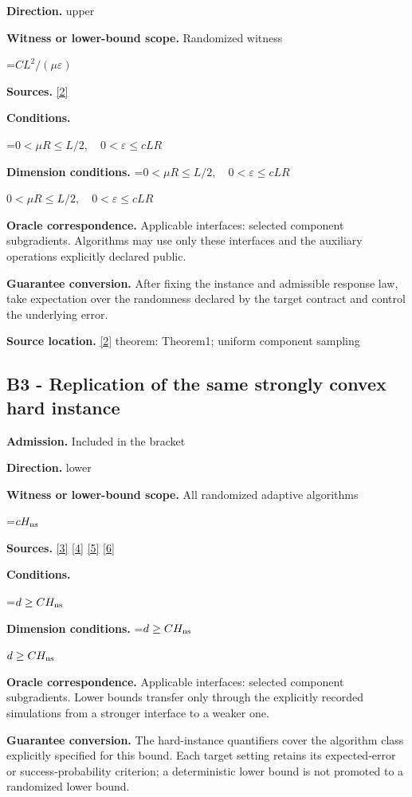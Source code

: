 \documentclass[10pt,a4paper]{article}
\newcommand{\AtlasMath}[1]{\par\begingroup\centering\setbox0=\hbox{$\displaystyle #1$}\ifdim\wd0>1.4\linewidth\typeout{ATLAS WIDE FORMULA: \the\wd0}\fi\ifdim\wd0>\linewidth\resizebox{\linewidth}{!}{\box0}\else\box0\fi\par\endgroup}
\newcommand{\AtlasInlineMath}[1]{\begingroup\setbox0=\hbox{$#1$}\ifdim\wd0>.4\linewidth\endgroup\AtlasMath{#1}\else\endgroup$#1$\fi}
\begin{document}
\textbf{Direction.} upper

\textbf{Witness or lower-bound scope.} Randomized witness

\AtlasMath{CL^2/(\mu\varepsilon)}
\textbf{Sources.} \href{https://jmlr.org/papers/volume15/hazan14a/hazan14a.pdf}{[2]}

\textbf{Conditions.} 
\AtlasMath{0<\mu R\le L/2,\quad0<\varepsilon\le cLR}


\textbf{Dimension conditions.} \AtlasInlineMath{0<\mu R\le L/2,\quad0<\varepsilon\le cLR}

\textbf{Oracle correspondence.} Applicable interfaces: selected component subgradients. Algorithms may use only these interfaces and the auxiliary operations explicitly declared public.

\textbf{Guarantee conversion.} After fixing the instance and admissible response law, take expectation over the randomness declared by the target contract and control the underlying error.

\textbf{Source location.} \href{https://jmlr.org/papers/volume15/hazan14a/hazan14a.pdf}{[2]} theorem: Theorem1; uniform component sampling

\subsection{B3 - Replication of the same strongly convex hard instance}
\textbf{Admission.} Included in the bracket

\textbf{Direction.} lower

\textbf{Witness or lower-bound scope.} All randomized adaptive algorithms

\AtlasMath{cH_{\rm ns}}
\textbf{Sources.} \href{https://proceedings.mlr.press/v97/zhou19b/zhou19b.pdf}{[3]} \href{https://arxiv.org/pdf/1405.4980}{[4]} \href{https://arxiv.org/pdf/1407.5144}{[5]} \href{https://arxiv.org/pdf/1401.1792}{[6]}

\textbf{Conditions.} 
\AtlasMath{d\ge CH_{\rm ns}}


\textbf{Dimension conditions.} \AtlasInlineMath{d\ge CH_{\rm ns}}

\textbf{Oracle correspondence.} Applicable interfaces: selected component subgradients. Lower bounds transfer only through the explicitly recorded simulations from a stronger interface to a weaker one.

\textbf{Guarantee conversion.} The hard-instance quantifiers cover the algorithm class explicitly specified for this bound. Each target setting retains its expected-error or success-probability criterion; a deterministic lower bound is not promoted to a randomized lower bound.
\end{document}
